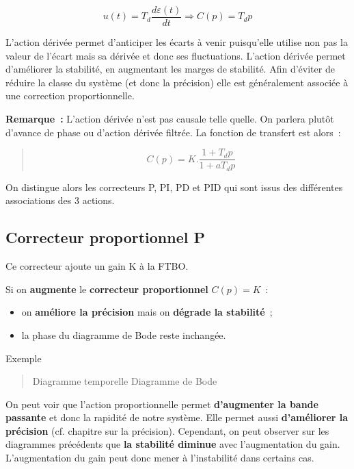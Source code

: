 \[u(t) = T_{d}\frac{d\varepsilon(t)}{dt} \Rightarrow \boxed{C(p) = T_{d}p}\]

L'action dérivée permet d'anticiper les écarts à venir puisqu'elle utilise non pas la valeur de l'écart mais sa dérivée et donc ses fluctuations. L'action dérivée permet d'améliorer la stabilité, en augmentant les marges de stabilité. Afin d'éviter de réduire la classe du système (et donc la précision) elle est généralement associée à une correction proportionnelle.

\textbf{Remarque~:} L'action dérivée n'est pas causale telle quelle. On parlera plutôt d'avance de phase ou d'action dérivée filtrée. La fonction de transfert est alors~:

\begin{quote}
\[\boxed{C(p) = K.\frac{1 + T_{d}p}{1 + aT_{d}p}}\]
\end{quote}

On distingue alors les correcteurs P, PI, PD et PID qui sont issus des différentes associations des 3 actions.

\hypertarget{correcteur-proportionnel-p}{%
\subsection{Correcteur proportionnel P}\label{correcteur-proportionnel-p}}

Ce correcteur ajoute un gain K à la FTBO.

Si on \textbf{augmente} le \textbf{correcteur proportionnel} \(C(p) = K\)~:

\begin{itemize}
\item
  on \textbf{améliore la précision} mais on \textbf{dégrade la stabilité}~;
\item
  la phase du diagramme de Bode reste inchangée.
\end{itemize}

Exemple

\begin{quote}
Diagramme temporelle Diagramme de Bode
\end{quote}

On peut voir que l'action proportionnelle permet \textbf{d'augmenter la bande passante} et donc la rapidité de notre système. Elle permet aussi \textbf{d'améliorer la précision} (cf. chapitre sur la précision). Cependant, on peut observer sur les diagrammes précédents que \textbf{la stabilité diminue} avec l'augmentation du gain. L'augmentation du gain peut donc mener à l'instabilité dans certains cas.

